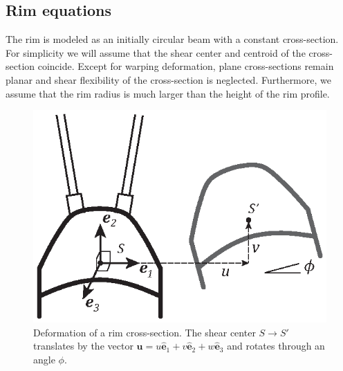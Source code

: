 \documentclass{bmd2016p}
\newcommand{\e}{\ensuremath{\hat{\bm{e}}_1}}
\newcommand{\ee}{\ensuremath{\hat{\bm{e}}_2}}
\newcommand{\eee}{\ensuremath{\hat{\bm{e}}_3}}
\begin{document}
\subsection{Rim equations}

The rim is modeled as an initially circular beam with a constant cross-section. For simplicity we will assume that the shear center and centroid of the cross-section coincide. Except for warping deformation, plane cross-sections remain planar and shear flexibility of the cross-section is neglected. Furthermore, we assume that the rim radius is much larger than the height of the rim profile.

\begin{figure}[!ht]
\centering
\includegraphics[scale=1.0]{figures/bmd_figures-06.eps}
\caption{Deformation of a rim cross-section. The shear center $S\rightarrow S'$ translates by the vector $\bm{u} = u\e + v\ee + w\eee$ and rotates through an angle $\phi$.}
\label{fig:def}
\end{figure}
\end{document}
